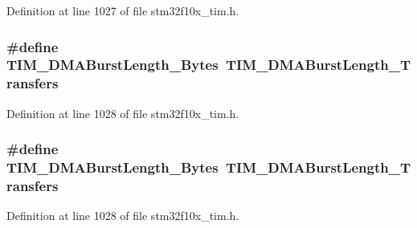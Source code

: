 Definition at line 1027 of file stm32f10x\+\_\+tim.\+h.

\subsubsection[{\texorpdfstring{T\+I\+M\+\_\+\+D\+M\+A\+Burst\+Length\+\_\+9\+Bytes}{TIM_DMABurstLength_9Bytes}}]{\setlength{\rightskip}{0pt plus 5cm}\#define T\+I\+M\+\_\+\+D\+M\+A\+Burst\+Length\+\_\+Bytes~{\bf T\+I\+M\+\_\+\+D\+M\+A\+Burst\+Length\+\_\+Transfers}}\hypertarget{group___t_i_m___legacy_ga2868d400329e705b89c1e425c9cb4fed}{}\label{group___t_i_m___legacy_ga2868d400329e705b89c1e425c9cb4fed}


Definition at line 1028 of file stm32f10x\+\_\+tim.\+h.

\subsubsection[{\texorpdfstring{T\+I\+M\+\_\+\+D\+M\+A\+Burst\+Length\+\_\+9\+Bytes}{TIM_DMABurstLength_9Bytes}}]{\setlength{\rightskip}{0pt plus 5cm}\#define T\+I\+M\+\_\+\+D\+M\+A\+Burst\+Length\+\_\+Bytes~{\bf T\+I\+M\+\_\+\+D\+M\+A\+Burst\+Length\+\_\+Transfers}}\hypertarget{group___t_i_m___legacy_ga2868d400329e705b89c1e425c9cb4fed}{}\label{group___t_i_m___legacy_ga2868d400329e705b89c1e425c9cb4fed}


Definition at line 1028 of file stm32f10x\+\_\+tim.\+h.

